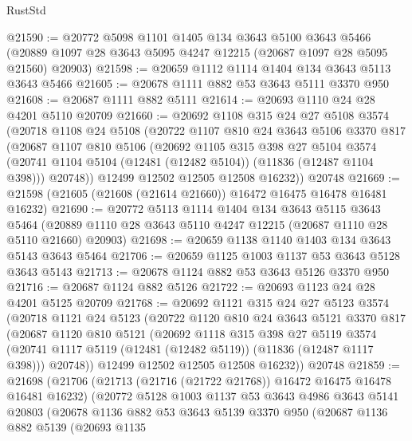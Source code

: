 \begin{lexlean}{RustStd}
\begin{coremodule}
@21590 := @20772
    @5098
    @1101
    @1405
    @134
    @3643
    @5100
    @3643
    @5466
    (@20889 @1097 @28 @3643 @5095 @4247 @12215 (@20687 @1097 @28 @5095 @21560) @20903)
@21598 := @20659 @1112 @1114 @1404 @134 @3643 @5113 @3643 @5466
@21605 := @20678 @1111 @882 @53 @3643 @5111 @3370 @950
@21608 := @20687 @1111 @882 @5111
@21614 := @20693 @1110 @24 @28 @4201 @5110 @20709
@21660 := @20692
    @1108
    @315
    @24
    @27
    @5108
    @3574
    (@20718
      @1108
      @24
      @5108
      (@20722
        @1107
        @810
        @24
        @3643
        @5106
        @3370
        @817
        (@20687
          @1107
          @810
          @5106
          (@20692
            @1105
            @315
            @398
            @27
            @5104
            @3574
            (@20741 @1104 @5104 (@12481 (@12482 @5104)) (@11836 (@12487 @1104 @398)))
            @20748))
        @12499
        @12502
        @12505
        @12508
        @16232))
    @20748
@21669 := @21598 (@21605 (@21608 (@21614 @21660)) @16472 @16475 @16478 @16481 @16232)
@21690 := @20772
    @5113
    @1114
    @1404
    @134
    @3643
    @5115
    @3643
    @5464
    (@20889 @1110 @28 @3643 @5110 @4247 @12215 (@20687 @1110 @28 @5110 @21660) @20903)
@21698 := @20659 @1138 @1140 @1403 @134 @3643 @5143 @3643 @5464
@21706 := @20659 @1125 @1003 @1137 @53 @3643 @5128 @3643 @5143
@21713 := @20678 @1124 @882 @53 @3643 @5126 @3370 @950
@21716 := @20687 @1124 @882 @5126
@21722 := @20693 @1123 @24 @28 @4201 @5125 @20709
@21768 := @20692
    @1121
    @315
    @24
    @27
    @5123
    @3574
    (@20718
      @1121
      @24
      @5123
      (@20722
        @1120
        @810
        @24
        @3643
        @5121
        @3370
        @817
        (@20687
          @1120
          @810
          @5121
          (@20692
            @1118
            @315
            @398
            @27
            @5119
            @3574
            (@20741 @1117 @5119 (@12481 (@12482 @5119)) (@11836 (@12487 @1117 @398)))
            @20748))
        @12499
        @12502
        @12505
        @12508
        @16232))
    @20748
@21859 := @21698
    (@21706
      (@21713 (@21716 (@21722 @21768)) @16472 @16475 @16478 @16481 @16232)
      (@20772
        @5128
        @1003
        @1137
        @53
        @3643
        @4986
        @3643
        @5141
        @20803
        (@20678
          @1136
          @882
          @53
          @3643
          @5139
          @3370
          @950
          (@20687
            @1136
            @882
            @5139
            (@20693
              @1135

\end{coremodule}
\end{lexlean}
